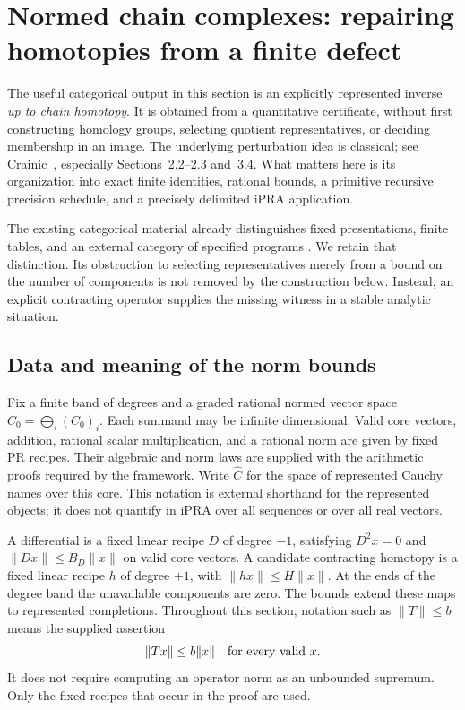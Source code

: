 \section{Normed chain complexes: repairing homotopies from a finite defect}
\label{sec:chain-repair}

The useful categorical output in this section is an explicitly represented
inverse \emph{up to chain homotopy}.  It is obtained from a quantitative
certificate, without first constructing homology groups, selecting quotient
representatives, or deciding membership in an image.  The underlying
perturbation idea is classical; see Crainic~\cite{crainic2004}, especially
Sections~2.2--2.3 and~3.4.  What matters here is its organization into exact
finite identities, rational bounds, a primitive recursive precision schedule,
and a precisely delimited iPRA application.

The existing categorical material already distinguishes fixed presentations,
finite tables, and an external category of specified programs
\cite{repo-categories}.  We retain that distinction.  Its obstruction to
selecting representatives merely from a bound on the number of components
\cite{repo-obstacles} is not removed by the construction below.  Instead,
an explicit contracting operator supplies the missing witness in a stable
analytic situation.

\subsection{Data and meaning of the norm bounds}

Fix a finite band of degrees and a graded rational normed vector space
$C_0=\bigoplus_i(C_0)_i$.  Each summand may be infinite dimensional.
Valid core vectors, addition, rational scalar multiplication, and a rational
norm are given by fixed PR recipes.  Their algebraic and norm laws are
supplied with the arithmetic proofs required by the framework.  Write
$\widehat C$ for the space of represented Cauchy names over this core.
This notation is external shorthand for the represented objects; it does
not quantify in iPRA over all sequences or over all real vectors.

A differential is a fixed linear recipe $D$ of degree $-1$, satisfying
$D^2x=0$ and $\|Dx\|\le B_D\|x\|$ on valid core vectors.  A candidate
contracting homotopy is a fixed linear recipe $h$ of degree $+1$, with
$\|hx\|\le H\|x\|$.  At the ends of the degree band the unavailable
components are zero.  The bounds extend these maps to represented
completions.  Throughout this section, notation such as $\|T\|\le b$
means the supplied assertion
\[
                         \|Tx\|\le b\|x\|
                         \quad\hbox{for every valid }x.
\]
It does not require computing an operator norm as an unbounded supremum.
Only the fixed recipes that occur in the proof are used.

